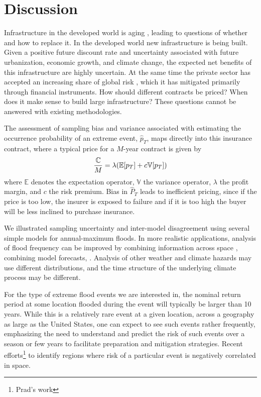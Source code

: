 \documentclass[12pt]{article}
\begin{document}
\section{Discussion}


Infrastructure in the developed world is aging \citep{Ho2017}, leading to questions of whether and how to replace it.
In the developed world new infrastructure is being built.
Given a positive future discount rate and uncertainty associated with future urbanization, economic growth, and climate change, the expected net benefits of this infrastructure are highly uncertain.
At the same time the private sector has accepted an increasing share of global risk \citep{WorldEconomicForum2016}, which it has mitigated primarily through financial instruments.
How should different contracts be priced? When does it make sense to build large infrastructure?
These questions cannot be answered with existing methodologies.

The assessment of sampling bias and variance associated with estimating the occurrence probability of an extreme event, $\hat{p}_T$, maps directly into this insurance contract, where a typical price for a $M$-year contract is given by
\begin{equation}\label{eq:insurance-price}
  \frac{\mathbb{C}}{M} = \lambda \qty(\mathbb{E} \qty[p_T] + c \mathbb{V} \qty[p_T])
\end{equation}
where $\mathbb{E}$ denotes the expectation operator, $\mathbb{V}$ the variance operator, $\lambda$ the profit margin, and $c$ the risk premium.
Bias in $\hat{P}_T$ leads to inefficient pricing, since if the price is too low, the insurer is exposed to failure and if it is too high the buyer will be less inclined to purchase insurance.

We illustrated sampling uncertainty and inter-model disagreement using several simple models for annual-maximum floods.
In more realistic applications, analysis of flood frequency can be improved by combining information across space \citep{Lima2016,Merz2008a}, combining model forecasts, \etc{}.
Analysis of other weather and climate hazards may use different distributions, and the time structure of the underlying climate process may be different.

For the type of extreme flood events we are interested in, the nominal return period at some location flooded during the event will typically be larger than 10 years.
While this is a relatively rare event at a given location, across a geography as large as the United States, one can expect to see such events rather frequently, emphasizing the need to understand and predict the risk of such events over a season or few years to facilitate preparation and mitigation strategies.
Recent efforts\footnote{Prad's work} to identify regions where risk of a particular event is negatively correlated in space.
\end{document}
